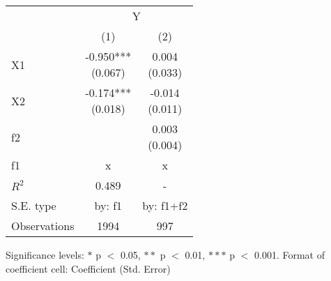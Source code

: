 \renewcommand\cellalign{t}
\begin{threeparttable}
\begin{tabular}{lcc}
\toprule
 & \multicolumn{2}{c}{Y} \\
\cmidrule(lr){2-3}
 & (1) & (2) \\
\midrule
X1 & \makecell{-0.950*** \\ (0.067)} & \makecell{0.004 \\ (0.033)} \\
X2 & \makecell{-0.174*** \\ (0.018)} & \makecell{-0.014 \\ (0.011)} \\
f2 &  & \makecell{0.003 \\ (0.004)} \\
\midrule
f1 & x & x \\
\midrule
$R^2$ & 0.489 & - \\
S.E. type & by: f1 & by: f1+f2 \\
Observations & 1994 & 997 \\
\bottomrule
\end{tabular}
\footnotesize Significance levels: $*$ p $<$ 0.05, $**$ p $<$ 0.01, $***$ p $<$ 0.001. Format of coefficient cell: Coefficient
 (Std. Error)
\end{threeparttable}
